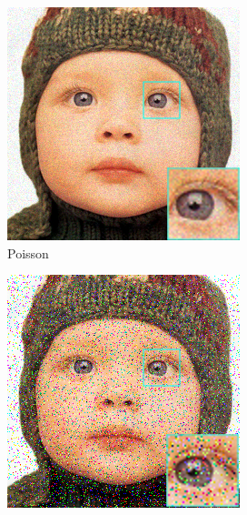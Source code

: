 \begin{figure}
\begin{subfigure}{0.24\textwidth}
		\includegraphics[width=\textwidth]{images/exp1.1/poisson0.png}
		\caption{Poisson}
	\end{subfigure}
	\begin{subfigure}{0.24\textwidth}
		\includegraphics[width=\textwidth]{images/exp1.1/salt0.png}

\end{subfigure}
\end{figure}
